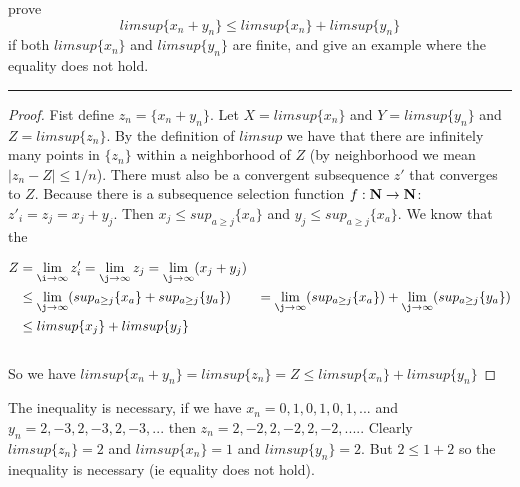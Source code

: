 \documentclass[11pt]{article}
\begin{document}
\newpage
{}

prove
$$limsup\{x_n + y_n\} \leq limsup\{x_n\} + limsup\{y_n\}$$
if both $limsup\{x_n\}$ and $limsup\{y_n\}$ are finite, and give an example where the equality does not hold.

\hrule

\begin{proof}

 Fist define $z_n = \{x_n + y_n\}$. Let $X = limsup\{x_n\}$ and $Y = limsup\{y_n\}$ and $Z = limsup\{z_n\}$. By the definition of $limsup$ we have that there are infinitely many points in $\{z_n\}$ within a neighborhood of $Z$ (by neighborhood we mean $|z_n - Z| \leq 1/n$). There must also be a convergent subsequence  $z'$ that converges to $Z$. Because there is a subsequence selection function $f: \mathbf{N} \to \mathbf{N}$: $z'_i = z_j = x_j + y_j$. Then $x_j \leq sup_{a \geq j}\{x_a\}$ and $y_j \leq sup_{a \geq j}\{x_a\}$. We know that the 
 


\begin{align*}
Z &= \lim_{\i \to \infty} z'_i = \lim_{\j \to \infty} z_j = \lim_{\j \to \infty} (x_j + y_j) \\
&\leq \lim_{\j \to \infty} (sup_{a \geq j}\{x_a\} + sup_{a \geq j}\{y_a\})
&= \lim_{\j \to \infty} (sup_{a \geq j}\{x_a\}) + \lim_{\j \to \infty} (sup_{a \geq j}\{y_a\}) \\
&\leq limsup\{x_j\} + limsup\{y_j\}
\end{align*}
 
$$$$

So we have $limsup\{x_n + y_n\} = limsup\{z_n\} = Z \leq limsup\{x_n\} + limsup\{y_n\}$
\end{proof}

The inequality is necessary, if we have $x_n = 0, 1, 0, 1, 0, 1, ...$ and $y_n = 2, -3, 2, -3, 2, -3, ...$ then $z_n = 2, -2, 2, -2, 2, -2, ....$. Clearly $limsup\{z_n\} = 2$ and $limsup\{x_n\} = 1$ and $limsup\{y_n\} = 2$. But $2 \leq 1 + 2$ so the inequality is necessary (ie equality does not hold).
\end{document}
